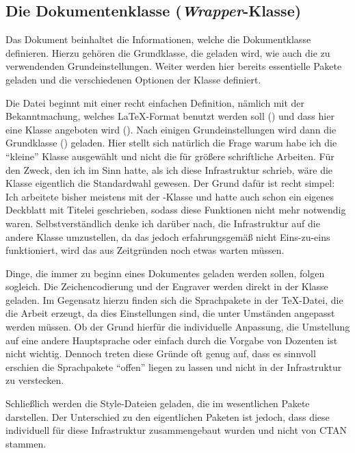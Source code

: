 \subsection{Die Dokumentenklasse (\textit{Wrapper}-Klasse)}
\label{subsec:Dokumentklasse}
Das Dokument  beinhaltet die Informationen, welche die Dokumentklasse definieren.
Hierzu gehören die Grundklasse, die geladen wird, wie auch die zu verwendenden Grundeinstellungen.
Weiter werden hier bereits essentielle Pakete geladen und die verschiedenen Optionen der Klasse definiert.

Die Datei beginnt mit einer recht einfachen Definition, nämlich mit der Bekanntmachung, welches \LaTeX-Format benutzt werden soll () und dass hier eine Klasse angeboten wird ().
Nach einigen Grundeinstellungen wird dann die Grundklasse () geladen.
Hier stellt sich natürlich die Frage warum habe ich die \enquote{kleine} Klasse ausgewählt und nicht die für größere schriftliche Arbeiten. Für den Zweck, den ich im Sinn hatte, als ich diese Infrastruktur schrieb, wäre die Klasse  eigentlich die Standardwahl gewesen.
Der Grund dafür ist recht simpel: Ich arbeitete bisher meistens mit der -Klasse und hatte auch schon ein eigenes Deckblatt mit Titelei geschrieben, sodass diese Funktionen nicht mehr notwendig waren.
Selbstverständlich denke ich darüber nach, die Infrastruktur auf die andere Klasse umzustellen, da das jedoch erfahrungsgemäß nicht Eins-zu-eins funktioniert, wird das aus Zeitgründen noch etwas warten müssen.

Dinge, die immer zu beginn eines Dokumentes geladen werden sollen, folgen sogleich.
Die Zeichencodierung und der Engraver werden direkt in der Klasse geladen.
Im Gegensatz hierzu finden sich die Sprachpakete in der \TeX-Datei, die die Arbeit erzeugt, da dies Einstellungen sind, die unter Umständen angepasst werden müssen.
Ob der Grund hierfür die individuelle Anpassung, die Umstellung auf eine andere Hauptsprache oder einfach durch die Vorgabe von Dozenten ist nicht wichtig. Dennoch  treten diese Gründe oft genug auf, dass es sinnvoll erschien die Sprachpakete \enquote{offen} liegen zu lassen und nicht in der Infrastruktur zu verstecken.

Schließlich werden die Style-Dateien geladen, die im wesentlichen Pakete darstellen.
Der Unterschied zu den eigentlichen Paketen ist jedoch, dass diese individuell für diese Infrastruktur zusammengebaut wurden und nicht von CTAN stammen.

